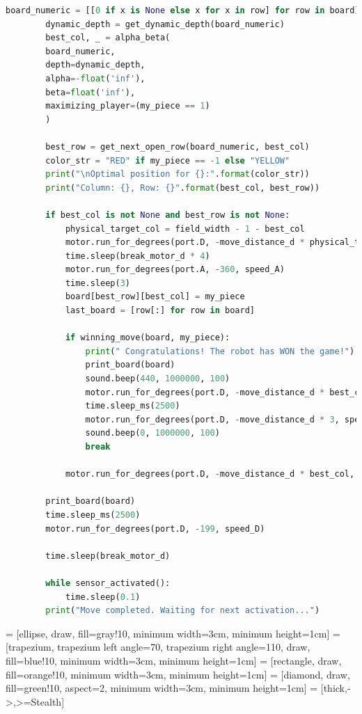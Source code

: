 \begin{lstlisting}[language=Python]
		board_numeric = [[0 if x is None else x for x in row] for row in board]
		dynamic_depth = get_dynamic_depth(board_numeric)
		best_col, _ = alpha_beta(
		board_numeric,
		depth=dynamic_depth,
		alpha=-float('inf'),
		beta=float('inf'),
		maximizing_player=(my_piece == 1)
		)
		
		best_row = get_next_open_row(board_numeric, best_col)
		color_str = "RED" if my_piece == -1 else "YELLOW"
		print("\nOptimal position for {}:".format(color_str))
		print("Column: {}, Row: {}".format(best_col, best_row))
		
		if best_col is not None and best_row is not None:
			physical_target_col = field_width - 1 - best_col
			motor.run_for_degrees(port.D, -move_distance_d * physical_target_col, speed_D)
			time.sleep(break_motor_d * 4)
			motor.run_for_degrees(port.A, -360, speed_A)
			time.sleep(3)
			board[best_row][best_col] = my_piece
			last_board = [row[:] for row in board]
			
			if winning_move(board, my_piece):
				print(" Congratulations! The robot has WON the game!")
				print_board(board)
				sound.beep(440, 1000000, 100)
				motor.run_for_degrees(port.D, -move_distance_d * best_col, speed_D)
				time.sleep_ms(2500)
				motor.run_for_degrees(port.D, -move_distance_d * 3, speed_D)
				sound.beep(0, 1000000, 100)
				break
		
			motor.run_for_degrees(port.D, -move_distance_d * best_col, speed_D)
		
		print_board(board)
		time.sleep_ms(2500)
		motor.run_for_degrees(port.D, -199, speed_D)
		
		time.sleep(break_motor_d)
		
		while sensor_activated():
			time.sleep(0.1)
		print("Move completed. Waiting for next activation...")
\end{lstlisting}

 = [ellipse, draw, fill=gray!10, minimum width=3cm, minimum height=1cm]
 = [trapezium, trapezium left angle=70, trapezium right angle=110, draw, fill=blue!10, minimum width=3cm, minimum height=1cm]
 = [rectangle, draw, fill=orange!10, minimum width=3cm, minimum height=1cm]
 = [diamond, draw, fill=green!10, aspect=2, minimum width=3cm, minimum height=1cm]
 = [thick,->,>=Stealth]

